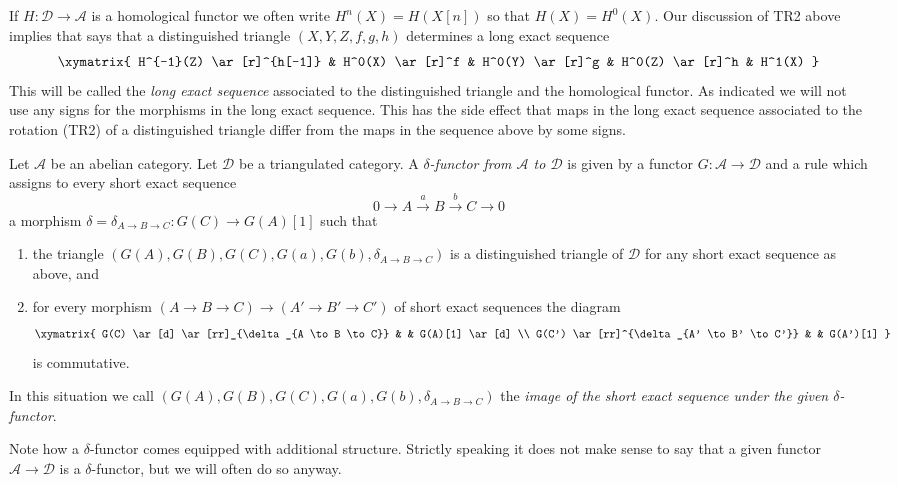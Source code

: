 \noindent
If $H : \mathcal{D} \to \mathcal{A}$ is a homological functor
we often write $H^n(X) = H(X[n])$ so that $H(X) = H^0(X)$.
Our discussion of TR2 above implies that says that a distinguished triangle
$(X, Y, Z, f, g, h)$ determines a long exact sequence
\begin{equation}
\label{equation-long-exact-cohomology-sequence}
\xymatrix{
H^{-1}(Z) \ar[r]^{h[-1]} &
H^0(X) \ar[r]^f &
H^0(Y) \ar[r]^g &
H^0(Z) \ar[r]^h &
H^1(X)
}
\end{equation}
This will be called the {\it long exact sequence} associated to the
distinguished triangle and the homological functor. As indicated
we will not use any signs for the morphisms in the long exact
sequence. This has the side effect that maps in the long exact sequence
associated to the rotation (TR2) of a distinguished triangle differ
from the maps in the sequence above by some signs.

\begin{definition}
\label{definition-delta-functor}
Let $\mathcal{A}$ be an abelian category.
Let $\mathcal{D}$ be a triangulated category.
A {\it $\delta$-functor from $\mathcal{A}$ to $\mathcal{D}$} is
given by a functor $G : \mathcal{A} \to \mathcal{D}$ and
a rule which assigns to every short exact sequence
$$
0 \to A \xrightarrow{a} B \xrightarrow{b} C \to 0
$$
a morphism $\delta = \delta_{A \to B \to C} : G(C) \to G(A)[1]$
such that
\begin{enumerate}
\item the triangle
$(G(A), G(B), G(C), G(a), G(b), \delta_{A \to B \to C})$
is a distinguished triangle of $\mathcal{D}$
for any short exact sequence as above, and
\item for every morphism $(A \to B \to C) \to (A' \to B' \to C')$
of short exact sequences the diagram
$$
\xymatrix{
G(C) \ar[d] \ar[rr]_{\delta_{A \to B \to C}} & &
G(A)[1] \ar[d] \\
G(C') \ar[rr]^{\delta_{A' \to B' \to C'}} & &
G(A')[1]
}
$$
is commutative.
\end{enumerate}
In this situation we call
$(G(A), G(B), G(C), G(a), G(b), \delta_{A \to B \to C})$
the {\it image of the short exact sequence under the
given $\delta$-functor}.
\end{definition}

\noindent
Note how a $\delta$-functor comes equipped with additional structure.
Strictly speaking it does not make sense to say that a given
functor $\mathcal{A} \to \mathcal{D}$ is a $\delta$-functor, but we
will often do so anyway.












